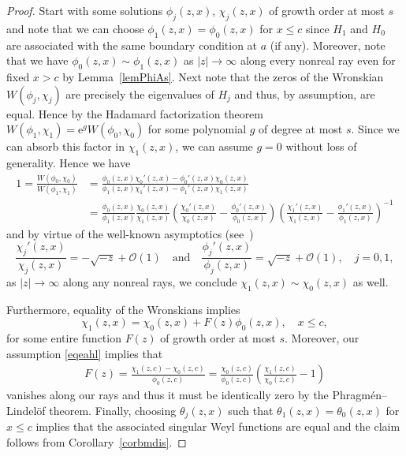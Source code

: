 \documentclass{amsart}
\numberwithin{equation}{section}
\begin{document}
\begin{proof}
Start with some solutions $\phi_j(z,x)$, $\chi_j(z,x)$ of growth order at most $s$ and note that we can choose $\phi_1(z,x) = \phi_0(z,x)$ for $x\le c$ since $H_1$ and $H_0$
are associated with the same boundary condition at $a$ (if any). Moreover, note that we have $\phi_0(z,x) \sim \phi_1(z,x)$ as $|z|\to\infty$
along every nonreal ray even for fixed $x>c$ by Lemma~\ref{lemPhiAs}. Next note that the zeros of the Wronskian $W(\phi_j,\chi_j)$ are
precisely the eigenvalues of $H_j$ and thus, by assumption, are equal. Hence by the Hadamard factorization theorem $W(\phi_1,\chi_1)= {\mathrm{e}}^{g} W(\phi_0,\chi_0)$
for some polynomial $g$ of degree at most $s$. Since we can absorb this factor in $\chi_1(z,x)$, we can assume $g=0$ without loss of generality. Hence we have
\begin{align*}
 1= \frac{W(\phi_0,\chi_0)}{W(\phi_1,\chi_1)} & = \frac{\phi_0(z,x)\chi_0'(z,x) - \phi_0'(z,x)\chi_0(z,x)}{\phi_1(z,x)\chi_1'(z,x) - \phi_1'(z,x)\chi_1(z,x)} \\
      & = \frac{\phi_0(z,x)}{\phi_1(z,x)} \frac{\chi_0(z,x)}{\chi_1(z,x)} \left(\frac{\chi_0'(z,x)}{\chi_0(z,x)} - \frac{\phi_0'(z,x)}{\phi_0(z,x)}\right)
      \left(\frac{\chi_1'(z,x)}{\chi_1(z,x)} - \frac{\phi_1'(z,x)}{\phi_1(z,x)}\right)^{-1}
\end{align*}
and by virtue of the well-known asymptotics (see~\cite[Lemma~9.19]{tschroe}) 
\[
 \frac{\chi_j'(z,x)}{\chi_j(z,x)} = - \sqrt{-z} + {\mathcal{O}}(1) \quad\text{and}\quad  \frac{\phi_j'(z,x)}{\phi_j(z,x)} = \sqrt{-z} + {\mathcal{O}}(1), \quad j=0,1,
\]
as $|z|\rightarrow\infty$ along any nonreal rays, we conclude $\chi_1(z,x) \sim \chi_0(z,x)$ as well.

Furthermore, equality of the Wronskians implies
\[
\chi_1(z,x) = \chi_0(z,x) + F(z) \phi_0(z,x), \quad x \le c,
\]
for some entire function $F(z)$ of growth order at most $s$. Moreover, our assumption \eqref{eqeahl} implies that
\begin{align*}
 F(z) = \frac{\chi_1(z,c)-\chi_0(z,c)}{\phi_0(z,c)} = \frac{\chi_0(z,c)}{\phi_0(z,c)}\left(\frac{\chi_1(z,c)}{\chi_0(z,c)} -1\right)
\end{align*}
vanishes along our rays and thus it must be identically zero by the Phragm\'en--Lindel\"of theorem. Finally, choosing
$\theta_j(z,x)$ such that $\theta_1(z,x) = \theta_0(z,x)$ for $x\le c$ implies that the associated singular Weyl functions
are equal and the claim follows from Corollary~\ref{corbmdis}.
\end{proof}
\end{document}
